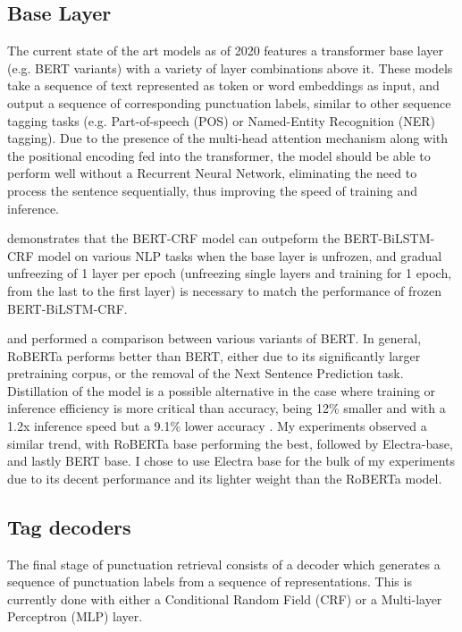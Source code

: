 \documentclass[a4paper]{article}
\begin{document}
\begin{multicols}{2}
\subsection{Base Layer}
The current state of the art models as of 2020 features a transformer base layer (e.g. BERT variants) with a variety of layer combinations above it. These models take a sequence of text represented as token or word embeddings as input, and output a sequence of corresponding punctuation labels, similar to other sequence tagging tasks (e.g. Part-of-speech (POS) or Named-Entity Recognition (NER) tagging). Due to the presence of the multi-head attention mechanism along with the positional encoding fed into the transformer, the model should be able to perform well without a Recurrent Neural Network, eliminating the need to process the sentence sequentially, thus improving the speed of training and inference. 

\citet{tuneornottotune} demonstrates that the BERT-CRF model can outpeform the BERT-BiLSTM-CRF model on various NLP tasks when the base layer is unfrozen, and gradual unfreezing of 1 layer per epoch (unfreezing single layers and training for 1 epoch, from the last to the first layer) is necessary to match the performance of frozen BERT-BiLSTM-CRF. 

\cite{medicalasr} and \cite{efficientbertrobust} performed a comparison between various variants of BERT. In general, RoBERTa performs better than BERT, either due to its significantly larger pretraining corpus, or the removal of the Next Sentence Prediction task. Distillation of the model is a possible alternative in the case where training or inference efficiency is more critical than accuracy, being 12\% smaller and with a 1.2x inference speed but a 9.1\% lower accuracy \citep{efficientbertrobust}. My experiments observed a similar trend, with RoBERTa base performing the best, followed by Electra-base, and lastly BERT base. I chose to use Electra base for the bulk of my experiments due to its decent performance and its lighter weight than the RoBERTa model.

\subsection{Tag decoders}
The final stage of punctuation retrieval consists of a decoder which generates a sequence of punctuation labels from a sequence of representations. This is currently done with either a Conditional Random Field (CRF) or a Multi-layer Perceptron (MLP) layer.


\end{multicols}
\end{document}
